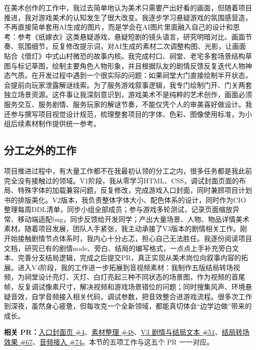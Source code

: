 在美术创作的工作中，我过去简单地认为美术只需要产出好看的画面，但随着项目推进，我对游戏美术的认知发生了很大改变。我逐步学习悬疑游戏的氛围感营造，不再直接简单套用AI生成的图片，而是学会在AI图片里面融入自己的设计和思考：参考《纸嫁衣》这类悬疑游戏、悬疑短剧的镜头语言，研究明暗对比、画面节奏、氛围细节，反复修改提示词，对AI生成的素材二次调整构图、光影，让画面贴合《借灯》中式山村微恐的故事内核。我完成村口、祠堂、老宅多套场景结构草图与标记草图，绘制主要角色人物形象，并且根据队友的剧情反馈反复迭代人物神态气质。在开发过程中遇到一个很实际的问题：如果祠堂大门直接绘制半开状态，会提前向玩家泄露解谜线索。为了服务游戏叙事逻辑，我专门绘制门开、门关两套独立场景资源。这件事让我深刻意识到，游戏美术不是纯粹的艺术创作，画面必须服务交互、服务剧情、服务玩家的解谜节奏，不能仅凭个人的审美喜好做设计。我还参与撰写项目视觉设计规范，梳理整套项目的字体、色彩、图像使用标准，为小组后续素材制作提供统一参考。

\subsection{分工之外的工作}

项目推进过程中，有大量工作都不在我最初认领的分工之内，很多任务都是我此前完全没有接触过的领域。V1阶段，我从零学习HTML、CSS，调试封面页面的布局、特殊字体的加载兼容问题，反复修改，完成游戏入口封面，同时兼顾项目计划书的排版美化。V2版本，我负责整体字体大小、配色体系的设计，同时作为CIO整理每周DDL清单，同步小组全部成员；参与游戏多轮测试，记录页面缩放异常、移动端适配bug，同步反馈给开发同学；产出大量场景、人物、物品详情美术素材。随着项目发展，团队人手紧张，我主动承接了V3版本的剧情相关工作。刚开始接触剧情节点体系时，我内心十分忐忑，担心自己无法胜任。我逐份阅读项目文档，研究已有的剧情node、旁白、结局的编写格式，一点点上手补充旁白文本、完善分支结局逻辑，完成之后提交PR，真正实现从美术岗位向叙事内容的拓展。进入V4阶段，我的工作进一步拓展到音视频素材：我制作五版结局转场视频，为祠堂设计亮灯、灭灯、白灯亮起三种不同状态的场景图，作为视频的首尾帧，反复调试像素尺寸，解决视频和游戏场景错位的问题；同时搜集风声、环境悬疑音效，自学音频接入相关代码，调试参数，把音效整合进游戏流程。很多次工作到深夜，虽然身心疲惫，但每攻克一个全新领域，都能真切体会“边学边做”带来的成长。

\textbf{相关 PR：}\href{https://github.com/214notfound/jiedeng/pull/4}{入口封面页 \#4}、\href{https://github.com/214notfound/jiedeng/pull/48}{素材整理 \#48}、\href{https://github.com/214notfound/jiedeng/pull/51}{V3 剧情与结局文本 \#51}、\href{https://github.com/214notfound/jiedeng/pull/67}{结局转场效果 \#67}、\href{https://github.com/214notfound/jiedeng/pull/74}{音频接入 \#74}。本节的五项工作与这五个 PR 一一对应。

